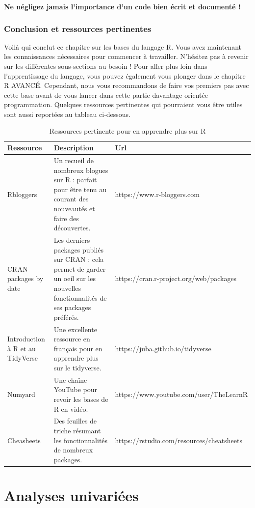 \documentclass[
  11pt,
  french,
]{book}
\begin{document}
\textbf{Ne négligez jamais l'importance d'un code bien écrit et documenté !}

\hypertarget{sect016}{%
\section{Conclusion et ressources pertinentes}\label{sect016}}

Voilà qui conclut ce chapitre sur les bases du langage R. Vous avez maintenant les connaissances nécessaires pour commencer à travailler. N'hésitez pas à revenir sur les différentes sous-sections au besoin ! Pour aller plus loin dans l'apprentissage du langage, vous pouvez également vous plonger dans le chapitre R AVANCÉ. Cependant, nous vous recommandons de faire vos premiers pas avec cette base avant de vous lancer dans cette partie davantage orientée programmation. Quelques ressources pertinentes qui pourraient vous être utiles sont aussi reportées au tableau ci-dessous.

\begin{table}

\caption{\label{tab:tableRessources}Ressources pertinente pour en apprendre plus sur R}
\centering
\fontsize{8}{10}\selectfont
\begin{tabular}[t]{l>{\raggedright\arraybackslash}p{6cm}>{\raggedright\arraybackslash}p{6cm}}
\toprule
Ressource & Description & Url\\
\midrule
Rbloggers & Un recueil de nombreux blogues sur R : parfait pour être tenu au courant des nouveautés et faire des découvertes. & https://www.r-bloggers.com\\
CRAN packages by date & Les derniers packages publiés sur CRAN : cela permet de garder un oeil sur les nouvelles fonctionnalités de ses packages préférés. & https://cran.r-project.org/web/packages\\
Introduction à R et au TidyVerse & Une excellente ressource en français pour en apprendre plus sur le tidyverse. & https://juba.github.io/tidyverse\\
Numyard & Une chaîne YouTube pour revoir les bases de R en vidéo. & https://www.youtube.com/user/TheLearnR\\
Cheasheets & Des feuilles de triche résumant les fonctionnalités de nombreux packages. & https://rstudio.com/resources/cheatsheets\\
\bottomrule
\end{tabular}
\end{table}

\hypertarget{part-analyses-univariuxe9es}{%
\part{Analyses univariées}\label{part-analyses-univariuxe9es}}
\end{document}
